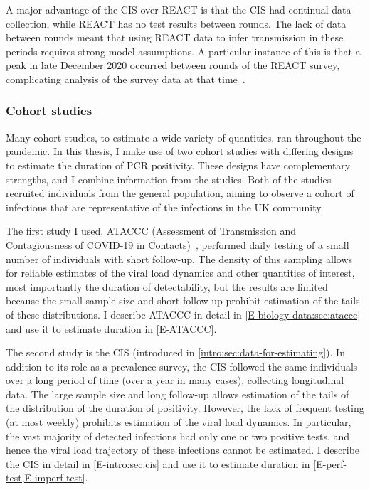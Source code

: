 \documentclass[thesis.tex]{subfiles}
\begin{document}
A major advantage of the CIS over REACT is that the CIS had continual data collection, while REACT has no test results between rounds.
The lack of data between rounds meant that using REACT data to infer transmission in these periods requires strong model assumptions.
A particular instance of this is that a peak in late December 2020 occurred between rounds of the REACT survey, complicating analysis of the survey data at that time~\autocite{rileyREACTround8}.

\subsubsection{Cohort studies}

Many cohort studies, to estimate a wide variety of quantities, ran throughout the pandemic.
In this thesis, I make use of two cohort studies with differing designs to estimate the duration of PCR positivity.
These designs have complementary strengths, and I combine information from the studies.
Both of the studies recruited individuals from the general population, aiming to observe a cohort of infections that are representative of the infections in the UK community.

The first study I used, ATACCC (Assessment of Transmission and Contagiousness of COVID-19 in Contacts)~\autocite{singanayagamCommunity,hakkiOnset}, performed daily testing of a small number of individuals with short follow-up.
The density of this sampling allows for reliable estimates of the viral load dynamics and other quantities of interest, most importantly the duration of detectability, but the results are limited because the small sample size and short follow-up prohibit estimation of the tails of these distributions.
I describe ATACCC in detail in \cref{E-biology-data:sec:ataccc} and use it to estimate duration in \cref{E-ATACCC}.

The second study is the CIS (introduced in \cref{intro:sec:data-for-estimating}).
In addition to its role as a prevalence survey, the CIS followed the same individuals over a long period of time (over a year in many cases), collecting longitudinal data.
The large sample size and long follow-up allows estimation of the tails of the distribution of the duration of positivity.
However, the lack of frequent testing (at most weekly) prohibits estimation of the viral load dynamics.
In particular, the vast majority of detected infections had only one or two positive tests, and hence the viral load trajectory of these infections cannot be estimated.
I describe the CIS in detail in \cref{E-intro:sec:cis} and use it to estimate duration in \cref{E-perf-test,E-imperf-test}.
\end{document}
